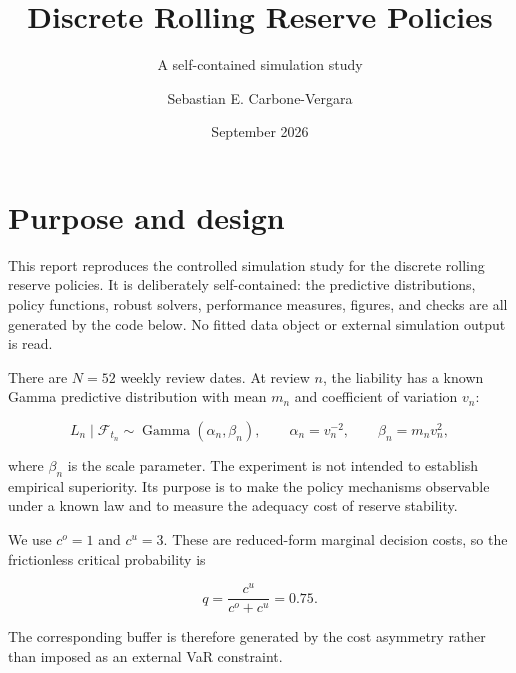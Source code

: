 \documentclass[
  10pt,
]{article}
\title{Discrete Rolling Reserve Policies}
\subtitle{A self-contained simulation study}
\author{Sebastian E. Carbone-Vergara}
\date{September 2026}
\begin{document}
\maketitle

{
\setcounter{tocdepth}{2}
\tableofcontents
}
\hypertarget{purpose-and-design}{%
\section{Purpose and design}\label{purpose-and-design}}

This report reproduces the controlled simulation study for the discrete
rolling reserve policies. It is deliberately self-contained: the
predictive distributions, policy functions, robust solvers, performance
measures, figures, and checks are all generated by the code below. No
fitted data object or external simulation output is read.

There are \(N=52\) weekly review dates. At review \(n\), the liability
has a known Gamma predictive distribution with mean \(m_n\) and
coefficient of variation \(v_n\):

\[
L_n\mid\mathcal F_{t_n}\sim\operatorname{Gamma}(\alpha_n,\beta_n),
\qquad
\alpha_n=v_n^{-2},\qquad \beta_n=m_nv_n^2,
\]

where \(\beta_n\) is the scale parameter. The experiment is not intended
to establish empirical superiority. Its purpose is to make the policy
mechanisms observable under a known law and to measure the adequacy cost
of reserve stability.

We use \(c^o=1\) and \(c^u=3\). These are reduced-form marginal decision
costs, so the frictionless critical probability is

\[
q=\frac{c^u}{c^o+c^u}=0.75.
\]

The corresponding buffer is therefore generated by the cost asymmetry
rather than imposed as an external VaR constraint.
\end{document}
